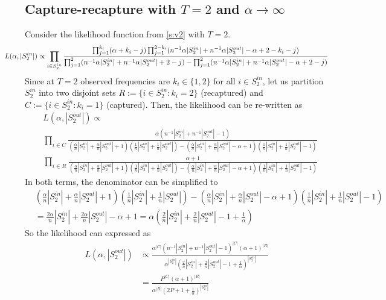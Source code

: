 \documentclass[a4paper, 12pt]{article}
\newcommand{\sout}[1][T]{|S^{out}_{#1}|}
\newcommand{\sint}[1][T]{|S^{in}_{#1}|}
\begin{document}
\subsection{Capture-recapture with $T=2$ and $\alpha \to \infty$}
Consider the likelihood function from \ref{s:v2} with $T = 2$.
\begin{align*}
    \hspace*{-1cm}
    L(\alpha, \sint[2]) &\propto \prod_{i \in S_2^{in}} \frac{\prod_{j=1}^{k_i} (\alpha + k_i - j)\prod_{j=1}^{2 - k_i} (n^{-1} \alpha \sint[2] + n^{-1} \alpha \sout[2] -\alpha + 2 - k_i - j)}{\prod_{j=1}^2(n^{-1}\alpha \sint[2] + n^{-1} \alpha \sout[2] + 2 - j) - \prod_{j=1}^2 (n^{-1} \alpha \sint[2] + n^{-1} \alpha \sout[2] - \alpha + 2 - j)} \\
\end{align*}
Since at $T = 2$ observed frequencies are $k_i \in \{1, 2\}$ for all $i \in S^{in}_2$, let us partition $S^{in}_2$ into two disjoint sets $R := \{i \in S^{in}_2: k_i = 2\}$ (recaptured) and $C := \{i \in S^{in}_2: k_i = 1\}$ (captured). Then, the likelihood can be re-written as
\begin{align*}
    &L(\alpha, \sout[2]) \propto\\
    &\prod_{i \in C} \frac{\alpha (n^{-1} \sint[2] + n^{-1} \sout[2] - 1)}{ (\frac{\alpha}{n}\sint[2] + \frac{\alpha}{n}\sout[2] + 1)(\frac{1}{n}\sint[2] + \frac{1}{n} \sout[2]) - (\frac{\alpha}{n}\sint[2] + \frac{\alpha}{n}\sout[2] - \alpha + 1)(\frac{1}{n}\sint[2] + \frac{1}{n} \sout[2] - 1)} \\
    &\prod_{i \in R} \frac{\alpha + 1}{ (\frac{\alpha}{n}\sint[2] + \frac{\alpha}{n}\sout[2] + 1)(\frac{1}{n}\sint[2] + \frac{1}{n} \sout[2]) - (\frac{\alpha}{n}\sint[2] + \frac{\alpha}{n}\sout[2] - \alpha + 1)(\frac{1}{n}\sint[2] + \frac{1}{n} \sout[2] - 1)}
\end{align*}
In both terms, the denominator can be simplified to
\begin{align*}
    &(\frac{\alpha}{n}\sint[2] + \frac{\alpha}{n}\sout[2] + 1)(\frac{1}{n}\sint[2] + \frac{1}{n} \sout[2]) - (\frac{\alpha}{n}\sint[2] + \frac{\alpha}{n}\sout[2] - \alpha + 1)(\frac{1}{n}\sint[2] + \frac{1}{n} \sout[2] - 1) \\
    &= \frac{2\alpha}{n}\sint[2] + \frac{2\alpha}{n}\sout[2] - \alpha + 1 = \alpha (\frac{2}{n}\sint[2] + \frac{2}{n}\sout[2] - 1 + \frac{1}{\alpha})
\end{align*}
So the likelihood can expressed as
\begin{align*}
    L(\alpha, \sout[2]) &\propto \frac{\alpha^{|C|}(n^{-1} \sint[2] + n^{-1} \sout[2] - 1)^{|C|}(\alpha + 1)^{|R|}}{\alpha^{\sint[2]} (\frac{2}{n}\sint[2] + \frac{2}{n}\sout[2] - 1 + \frac{1}{\alpha})^{\sint[2]}}\\
    &= \frac{P^{|C|}(\alpha + 1)^{|R|}}{\alpha^{|R|} (2P + 1 + \frac{1}{\alpha})^{\sint[2]}}
\end{align*}
\end{document}

